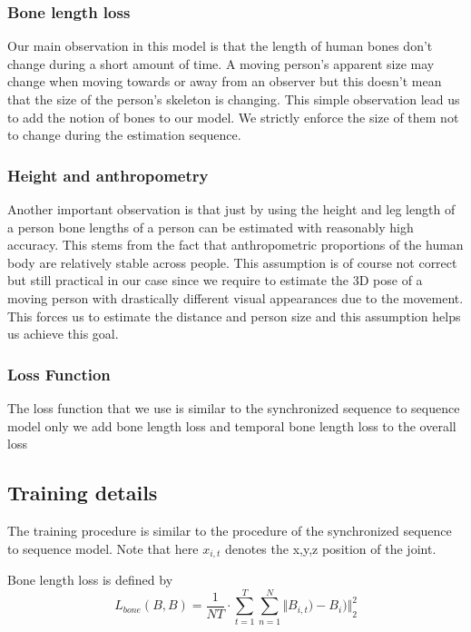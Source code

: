 \subsubsection{Bone length loss}

Our main observation in this model is that the length of human bones don't change during a short amount of time. A moving person's apparent size may change when moving towards or away from an observer but this doesn't mean that the size of the person's skeleton is changing. This simple observation lead us to add the notion of bones to our model. We strictly enforce the size of them not to change during the estimation sequence.

\subsubsection{Height and anthropometry}

Another important observation is that just by using the height and leg length of a person bone lengths of a person can be estimated with reasonably high accuracy. This stems from the fact that anthropometric proportions of the human body are relatively stable across people. This assumption is of course not correct but still practical in our case since we require to estimate the 3D pose of a moving person with drastically different visual appearances due to the movement. This forces us to estimate the distance and person size and this assumption helps us achieve this goal.

\subsubsection{Loss Function}

The loss function that we use is similar to the synchronized sequence to sequence model only we add bone length loss and temporal bone length loss to the overall loss

\subsection{Training details}

The training procedure is similar to the procedure of the synchronized sequence to sequence model. Note that here $ x_{i,t} $ denotes the x,y,z position of the joint.

Bone length loss is defined by
\begin{equation}	
    L_{bone}(B,B) = \frac{1}{NT} \cdot \sum_{t=1}^{T} \sum_{n=1}^{N} {\Vert B_{i,t})-B_{i}) \Vert}_2^2
\end{equation}

